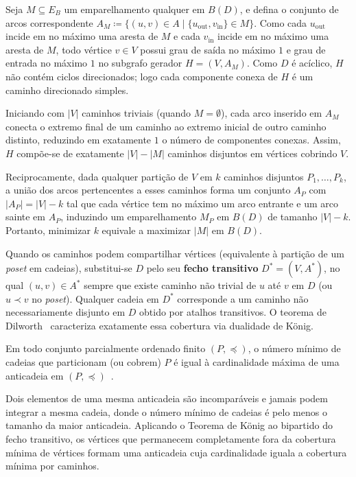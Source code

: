 \begin{demonstracao}
Seja $M \subseteq E_B$ um emparelhamento qualquer em $B(D)$, e defina o conjunto de arcos correspondente $A_M \coloneqq \{(u, v) \in A \mid \{u_{\text{out}}, v_{\text{in}}\} \in M\}$. Como cada $u_{\text{out}}$ incide em no máximo uma aresta de $M$ e cada $v_{\text{in}}$ incide em no máximo uma aresta de $M$, todo vértice $v \in V$ possui grau de saída no máximo $1$ e grau de entrada no máximo $1$ no subgrafo gerador $H = (V, A_M)$. Como $D$ é acíclico, $H$ não contém ciclos direcionados; logo cada componente conexa de $H$ é um caminho direcionado simples.

Iniciando com $|V|$ caminhos triviais (quando $M = \emptyset$), cada arco inserido em $A_M$ conecta o extremo final de um caminho ao extremo inicial de outro caminho distinto, reduzindo em exatamente $1$ o número de componentes conexas. Assim, $H$ compõe-se de exatamente $|V| - |M|$ caminhos disjuntos em vértices cobrindo $V$.

Reciprocamente, dada qualquer partição de $V$ em $k$ caminhos disjuntos $P_1, \dots, P_k$, a união dos arcos pertencentes a esses caminhos forma um conjunto $A_P$ com $|A_P| = |V| - k$ tal que cada vértice tem no máximo um arco entrante e um arco sainte em $A_P$, induzindo um emparelhamento $M_P$ em $B(D)$ de tamanho $|V| - k$. Portanto, minimizar $k$ equivale a maximizar $|M|$ em $B(D)$.
\end{demonstracao}

Quando os caminhos podem compartilhar vértices (equivalente à partição de um \textit{poset} em cadeias), substitui-se $D$ pelo seu \textbf{fecho transitivo} $D^* = (V, A^*)$, no qual $(u, v) \in A^*$ sempre que existe caminho não trivial de $u$ até $v$ em $D$ (ou $u \prec v$ no \textit{poset}). Qualquer cadeia em $D^*$ corresponde a um caminho não necessariamente disjunto em $D$ obtido por atalhos transitivos. O teorema de Dilworth~\cite{dilworth1950decomposition} caracteriza exatamente essa cobertura via dualidade de König.

\begin{teorema}
Em todo conjunto parcialmente ordenado finito $(P, \preceq)$, o número mínimo de cadeias que particionam (ou cobrem) $P$ é igual à cardinalidade máxima de uma anticadeia em $(P, \preceq)$~\cite{dilworth1950decomposition, schrijver2003combinatorial}.
\end{teorema}

 Dois elementos de uma mesma anticadeia são incomparáveis e jamais podem integrar a mesma cadeia, donde o número mínimo de cadeias é pelo menos o tamanho da maior anticadeia. Aplicando o Teorema de König ao bipartido do fecho transitivo, os vértices que permanecem completamente fora da cobertura mínima de vértices formam uma anticadeia cuja cardinalidade iguala a cobertura mínima por caminhos.

